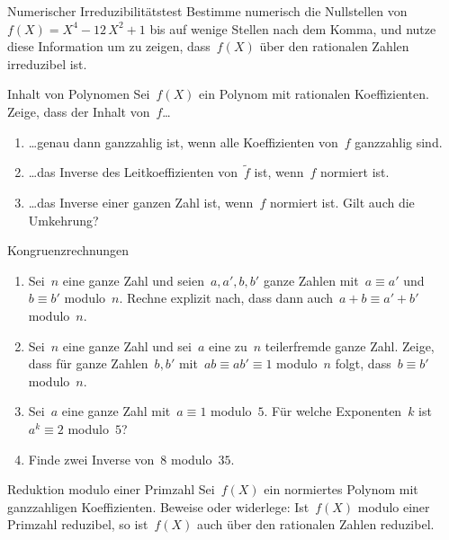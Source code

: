 \documentclass{algblatt}
\begin{document}
\vspace*{-1.5cm}

\begin{aufgabe}{Numerischer Irreduzibilitätstest}
Bestimme numerisch die Nullstellen von~$f(X) = X^4 - 12\,X^2 + 1$ bis auf
wenige Stellen nach dem Komma, und nutze diese Information um zu zeigen,
dass~$f(X)$ über den rationalen Zahlen irreduzibel ist.
\end{aufgabe}

\begin{aufgabe}{Inhalt von Polynomen}
Sei~$f(X)$ ein Polynom mit rationalen Koeffizienten. Zeige, dass der
Inhalt von~$f$\ldots
\begin{enumerate}
\item \ldots genau dann ganzzahlig ist, wenn alle
Koeffizienten von~$f$ ganzzahlig sind.
\item \ldots das Inverse des Leitkoeffizienten
von~$\widetilde f$ ist, wenn~$f$ normiert ist.
\item \ldots das Inverse einer ganzen Zahl ist,
wenn~$f$ normiert ist. Gilt auch die Umkehrung?
\end{enumerate}
\end{aufgabe}

\begin{aufgabe}{Kongruenzrechnungen}
\begin{enumerate}
\item Sei~$n$ eine ganze Zahl und seien~$a,a', b,b'$ ganze Zahlen mit~$a \equiv
a'$ und~$b \equiv b'$ modulo~$n$. Rechne explizit nach, dass dann auch~$a+b
\equiv a'+b'$ modulo~$n$.
\item Sei~$n$ eine ganze Zahl und sei~$a$ eine zu~$n$ teilerfremde ganze Zahl.
Zeige, dass für ganze Zahlen~$b, b'$ mit~$a b \equiv a b' \equiv 1$ modulo~$n$
folgt, dass~$b \equiv b'$ modulo~$n$.
\item Sei~$a$ eine ganze Zahl mit~$a \equiv 1$ modulo~$5$. Für welche
Exponenten~$k$ ist~$a^k \equiv 2$ modulo~$5$?
\item Finde zwei Inverse von~$8$ modulo~$35$.
\end{enumerate}
\end{aufgabe}

\begin{aufgabe}{Reduktion modulo einer Primzahl}
Sei~$f(X)$ ein normiertes Polynom mit ganzzahligen Koeffizienten. Beweise oder
widerlege: Ist~$f(X)$ modulo einer Primzahl reduzibel, so ist~$f(X)$ auch über
den rationalen Zahlen reduzibel.
\end{aufgabe}
\end{document}
